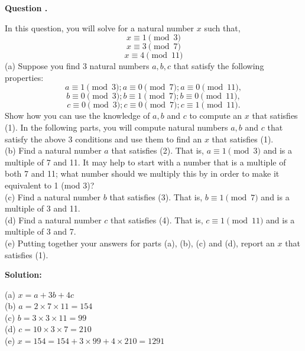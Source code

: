 \documentclass[12pt]{article}
\newcounter{questionnumber}
\newenvironment{question}[1][]{\stepcounter{questionnumber}\par\noindent\textbf{Question \thequestionnumber. #1}\par}{\par}
\newenvironment{solution}{\par\noindent\textbf{Solution:}\par}{\par\vspace{1em}}
\begin{document}
\begin{question}
    In this question, you will solve for a natural number $x$ such that,
    \begin{equation*}
    x \equiv 1 \pmod{3}
    \end{equation*}
    \begin{equation*}
    x \equiv 3 \pmod{7}
    \end{equation*}
    \begin{equation}
    x \equiv 4 \pmod{11}
    \end{equation}
    (a) Suppose you find 3 natural numbers $a, b, c$ that satisfy the following properties:
    \begin{equation}
    a \equiv 1 \pmod{3}; a \equiv 0 \pmod{7}; a \equiv 0 \pmod{11},
    \end{equation}
    \begin{equation}
    b \equiv 0 \pmod{3}; b \equiv 1 \pmod{7}; b \equiv 0 \pmod{11},
    \end{equation}
    \begin{equation}
    c \equiv 0 \pmod{3}; c \equiv 0 \pmod{7}; c \equiv 1 \pmod{11}.
    \end{equation}
    Show how you can use the knowledge of $a, b$ and $c$ to compute an $x$ that satisfies (1).
    In the following parts, you will compute natural numbers $a, b$ and $c$ that satisfy the above 3 conditions and use them to find an $x$ that satisfies (1).\\
    (b) Find a natural number $a$ that satisfies (2). That is, $a \equiv 1 \pmod{3}$ and is a multiple of 7 and 11. It may help to start with a number that is a multiple of both 7 and 11; what number should we multiply this by in order to make it equivalent to 1 (mod 3)?\\
    (c) Find a natural number $b$ that satisfies (3). That is, $b \equiv 1 \pmod{7}$ and is a multiple of 3 and 11.\\
    (d) Find a natural number $c$ that satisfies (4). That is, $c \equiv 1 \pmod{11}$ and is a multiple of 3 and 7.\\
    (e) Putting together your answers for parts (a), (b), (c) and (d), report an $x$ that satisfies (1).
\end{question}
\begin{solution}
    \noindent
    (a) $x=a+3b+4c$\\
    (b) $a=2\times 7\times 11=154$\\
    (c) $b=3\times 3\times 11=99$\\
    (d) $c=10\times 3\times 7=210$\\
    (e) $x=154=154+3\times 99+4\times 210=1291$
\end{solution}
\end{document}
